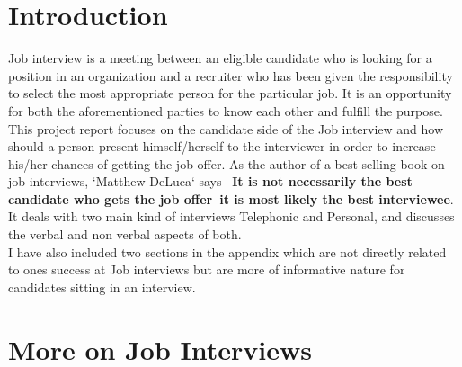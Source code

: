 \documentclass[a4paper,12pt]{report}
\begin{document}
\section{Introduction}             %
Job interview  is a meeting between an eligible candidate who is looking for a position in an organization and a recruiter who has been 
given the responsibility to select the most appropriate person for the particular job. It is an opportunity for both the aforementioned 
parties to know each other and fulfill the purpose. \\This project report focuses on the candidate side of the Job interview and how should a person
present himself/herself to the interviewer in order to increase his/her chances of getting the job offer.
As the author of a best selling book on job interviews, `Matthew DeLuca` \cite{matthewluca} says--
{\bf It is not necessarily the best candidate who gets the job offer--it is most likely the best interviewee}. It deals with two
main kind of interviews Telephonic and Personal, and discusses the verbal and non verbal aspects of both.\\
I have also included two sections in the appendix which are not directly related to ones success at Job interviews
but are more of informative nature for candidates sitting in an interview.
\section{More on Job Interviews}       %
\end{document}
